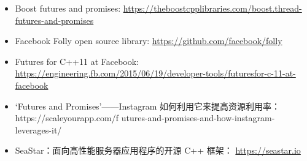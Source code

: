 
\begin{itemize}
\item
Boost futures and promises:  \url{https://theboostcpplibraries.com/boost.thread-futures-and-promises}

\item
Facebook Folly open source library: \url{https://github.com/facebook/folly}

\item
Futures for C++11 at Facebook: \url{https://engineering.fb.com/2015/06/19/developer-tools/futuresfor-c-11-at-facebook}

\item
‘Futures and Promises’——Instagram 如何利用它来提高资源利用率： https://scaleyourapp.com/f utures-and-promises-and-how-instagram- leverages-it/

\item
SeaStar：面向高性能服务器应用程序的开源 C++ 框架： \url{https://seastar.io}
\end{itemize}